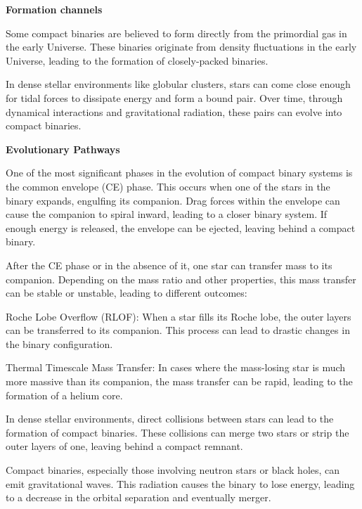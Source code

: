 \textbf{Formation channels}


Some compact binaries are believed to form directly from the primordial gas in the early Universe. These binaries originate from density fluctuations in the early Universe, leading to the formation of closely-packed binaries.


In dense stellar environments like globular clusters, stars can come close enough for tidal forces to dissipate energy and form a bound pair. Over time, through dynamical interactions and gravitational radiation, these pairs can evolve into compact binaries.

\textbf{Evolutionary Pathways}


One of the most significant phases in the evolution of compact binary systems is the common envelope (CE) phase. This occurs when one of the stars in the binary expands, engulfing its companion. Drag forces within the envelope can cause the companion to spiral inward, leading to a closer binary system. If enough energy is released, the envelope can be ejected, leaving behind a compact binary.


After the CE phase or in the absence of it, one star can transfer mass to its companion. Depending on the mass ratio and other properties, this mass transfer can be stable or unstable, leading to different outcomes:

    Roche Lobe Overflow (RLOF): When a star fills its Roche lobe, the outer layers can be transferred to its companion. This process can lead to drastic changes in the binary configuration.

    Thermal Timescale Mass Transfer: In cases where the mass-losing star is much more massive than its companion, the mass transfer can be rapid, leading to the formation of a helium core.


In dense stellar environments, direct collisions between stars can lead to the formation of compact binaries. These collisions can merge two stars or strip the outer layers of one, leaving behind a compact remnant.


Compact binaries, especially those involving neutron stars or black holes, can emit gravitational waves. This radiation causes the binary to lose energy, leading to a decrease in the orbital separation and eventually merger.

